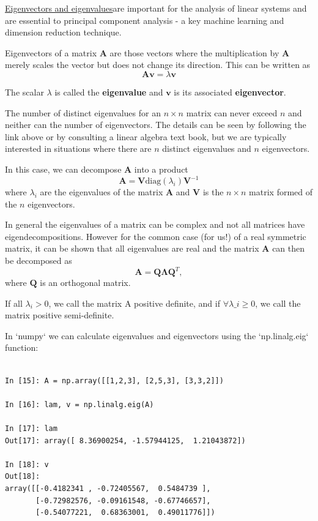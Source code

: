 \documentclass[a4paper,10pt]{article}
\begin{document}
\href{https://en.wikipedia.org/wiki/Eigenvalues_and_eigenvectors}{Eigenvectors and eigenvalues}are important for the analysis of linear systems and are essential to principal component analysis - a key machine learning and dimension reduction technique.

Eigenvectors of a matrix $\mathbf{A}$ are those vectors where the multiplication by $\mathbf{A}$ merely scales the vector but does not change its direction. This can be written as
$$\mathbf{A}\mathbf{v} = \lambda \mathbf{v}$$

The scalar $\lambda$ is called the \textbf{eigenvalue} and $\mathbf{v}$ is its associated \textbf{eigenvector}.

The number of distinct eigenvalues for an $n\times n$ matrix can never exceed $n$ and neither can the number of eigenvectors. The details can be seen by following the link above or by consulting a linear algebra text book, but we are typically interested in situations where there are $n$ distinct eigenvalues and $n$ eigenvectors.

In this case, we can decompose $\mathbf{A}$ into a product
$$\mathbf{A} = \mathbf{V} \mathrm{diag}(\lambda_i) \mathbf{V}^{-1}$$
where $\lambda_i$ are the eigenvalues of the matrix $\mathbf{A}$ and $\mathbf{V}$ is the $n\times n$ matrix formed of the $n$ eigenvectors.

In general the eigenvalues of a matrix can be complex and not all matrices have eigendecompositions. However for the common case (for us!) of a real symmetric matrix, it can be shown that all eigenvalues are real and the matrix $\mathbf{A}$ can then be decomposed as
$$\mathbf{A} = \mathbf{Q} \mathbf{\Lambda} \mathbf{Q}^T,$$
where $\mathbf{Q}$ is an orthogonal matrix.

If all $\lambda_i >0$, we call the matrix $\mathrm{A}$ positive definite, and if $\forall \lambda\_i \ge 0$, we call the matrix positive semi-definite. 


In `numpy` we can calculate eigenvalues and eigenvectors using the `np.linalg.eig` function:
\begin{lstlisting}

In [15]: A = np.array([[1,2,3], [2,5,3], [3,3,2]])

In [16]: lam, v = np.linalg.eig(A)

In [17]: lam
Out[17]: array([ 8.36900254, -1.57944125,  1.21043872])

In [18]: v
Out[18]: 
array([[-0.4182341 , -0.72405567,  0.5484739 ],
       [-0.72982576, -0.09161548, -0.67746657],
       [-0.54077221,  0.68363001,  0.49011776]])
\end{lstlisting}
\end{document}
